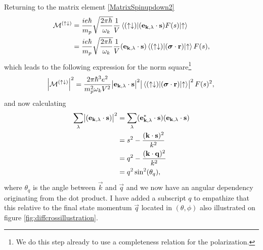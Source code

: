 Returning to the matrix element \eqref{MatrixSpinupdown2}
\begin{align}
    \mathcal{M^{(\uparrow\downarrow)}} &= \frac{ie\hbar}{m_p}\sqrt{\frac{2\pi \hbar}{\omega_k}}\frac{1}{V}\mel*{(\uparrow\downarrow)}{(\bm{\mathrm{e}}_{\bm{\mathrm{k}},\lambda}\cdot\bm{\mathrm{s}})F(s)}{\uparrow} \\
    &=\frac{ie\hbar}{m_p}\sqrt{\frac{2\pi \hbar}{\omega_k}}\frac{1}{V} (\bm{\mathrm{e}}_{\bm{\mathrm{k}},\lambda}\cdot\bm{\mathrm{s}})\mel*{(\uparrow\downarrow)}{(\bm{\mathrm{\sigma}}\cdot \bm{\mathrm{r}})}{\uparrow}F(s),
\end{align}
which leads to the following expression for the norm square\footnote{We do this step already to use a completeness relation for the polarization.}
\begin{equation} \label{matrixspinupdownabs}
    \abs{\mathcal{M}^{(\uparrow\downarrow)}}^2 = \frac{2\pi\hbar^3e^2}{m_p^2\omega_k V^2} \abs{\bm{\mathrm{e}}_{\bm{\mathrm{k}},\lambda}\cdot \bm{\mathrm{s}}}^2 \abs{\mel*{(\uparrow\downarrow)}{(\bm{\mathrm{\sigma}}\cdot \bm{\mathrm{r}})}{\uparrow}}^2 F(s)^2,
\end{equation}
and now calculating
\begin{align} \label{sumoverpol}
    \sum_\lambda \abs{(\bm{\mathrm{e}}_{\bm{\mathrm{k}},\lambda} \cdot \bm{\mathrm{s}})}^2 &= \sum_\lambda (\bm{\mathrm{e}}_{\bm{\mathrm{k}},\lambda}^*\cdot \bm{\mathrm{s}})(\bm{\mathrm{e}}_{\bm{\mathrm{k}},\lambda}\cdot\bm{\mathrm{s}}) \\
    &= s^2 -\frac{(\bm{\mathrm{k}}\cdot \bm{\mathrm{s}})^2}{k^2} \\
    &= q^2 -\frac{(\bm{\mathrm{k}}\cdot \bm{\mathrm{q}})^2}{k^2} \\
    &= q^2 \sin^2(\theta_q),
\end{align}
where $\theta_q$ is the angle between $\vec{k}$ and $\vec{q}$ and we now have an angular dependency originating from the dot product. I have added a subscript $q$ to empathize that this relative to the final state momentum $\vec{q}$ located in $(\theta, \phi)$ also illustrated on figure \ref{fig:diffcrossillustration}.

